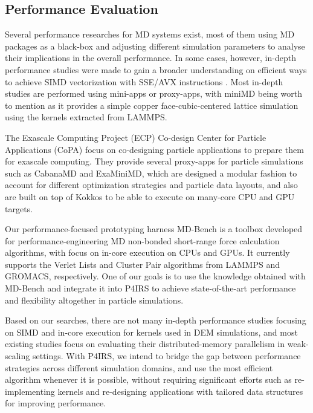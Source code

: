 \documentclass[preprint,12pt]{elsarticle}
\begin{document}
\subsection{Performance Evaluation}
\label{sec:perfeval}

Several performance researches for MD systems exist, most of them using MD packages as a black-box and adjusting different simulation parameters to analyse their implications in the overall performance.
In some cases, however, in-depth performance studies were made to gain a broader understanding on efficient ways to achieve SIMD vectorization with SSE/AVX instructions \cite{mdsimd}. Most in-depth studies are performed using mini-apps or proxy-apps, with miniMD being worth to mention as it provides a simple copper face-cubic-centered lattice simulation using the kernels extracted from LAMMPS.

The Exascale Computing Project (ECP) Co-design Center for Particle Applications (CoPA) \cite{ecpcopa} focus on co-designing particle applications to prepare them for exascale computing.
They provide several proxy-apps for particle simulations such as CabanaMD and ExaMiniMD, which are designed a modular fashion to account for different optimization strategies and particle data layouts, and also are built on top of Kokkos to be able to execute on many-core CPU and GPU targets.

Our performance-focused prototyping harness MD-Bench \cite{mdbench1,mdbench2} is a toolbox developed for performance-engineering \ac{MD} non-bonded short-range force calculation algorithms, with focus on in-core execution on CPUs and GPUs.
It currently supports the Verlet Lists and Cluster Pair algorithms from LAMMPS and GROMACS, respectively.
One of our goals is to use the knowledge obtained with MD-Bench and integrate it into P4IRS to achieve state-of-the-art performance and flexibility altogether in particle simulations.

Based on our searches, there are not many in-depth performance studies focusing on SIMD and in-core execution for kernels used in DEM simulations, and most existing studies focus on evaluating their distributed-memory parallelism in weak-scaling settings.
With P4IRS, we intend to bridge the gap between performance strategies across different simulation domains, and use the most efficient algorithm whenever it is possible, without requiring significant efforts such as re-implementing kernels and re-designing applications with tailored data structures for improving performance.
\end{document}
